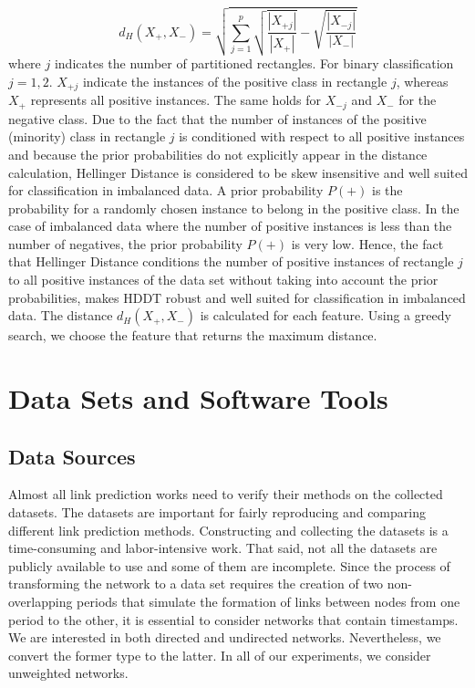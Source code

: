 \documentclass{acm_proc_article-sp}
\begin{document}
\begin{equation*}
	d_H(X{_+},X{_-}) = \sqrt{\sum_{j = 1}^{p} \sqrt{\frac{|X{_{+j}}|}{|X{{_+}}|}} - 							\sqrt{\frac{|X{_{-j}}|}	{|X{{_-}}|}}}
\end{equation*}
where $j$ indicates the number of partitioned rectangles. For binary classification $j = 1,2$. $X_{+j}$ indicate the instances of the positive class in rectangle $j$, whereas $X_{+}$ represents all positive instances. The same holds for $X_{-j}$ and $X_{-}$ for the negative class. Due to the fact that the number of instances of the positive (minority) class in rectangle $j$ is conditioned with respect to all positive instances and because the prior probabilities do not explicitly appear in the distance calculation, Hellinger Distance is considered to be skew insensitive and well suited for classification in imbalanced data. A prior probability $P(+)$ is the probability for a randomly chosen instance to belong in the positive class. In the case of imbalanced data where the number of positive instances is less than the number of negatives, the prior probability $P(+)$ is very low. Hence, the fact that Hellinger Distance conditions the number of positive instances of rectangle $j$ to all positive instances of the data set without taking into account the prior probabilities, makes HDDT robust and well suited for classification in imbalanced data. The distance $d_H(X_{+},X_{-})$ is calculated for each feature. Using a greedy search, we choose the feature that returns the maximum distance.
 
\section{Data Sets and Software Tools}
\label{Sect.5}
\subsection{Data Sources}
Almost all link prediction works need to verify their methods on the collected datasets. The datasets are important for fairly reproducing and comparing different link prediction methods. Constructing and collecting the datasets is a time-consuming and labor-intensive work. That said, not all the datasets are publicly available to use and some of them are incomplete. Since the process of transforming the network to a data set requires the creation of two non-overlapping periods that simulate the formation of links between nodes from one period to the other, it is essential to consider networks that contain timestamps. We are interested in both directed and undirected networks. Nevertheless, we convert the former type to the latter. In all of our experiments, we consider unweighted networks.
\end{document}
